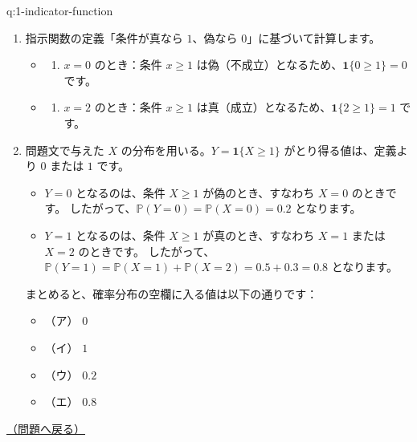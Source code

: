 \documentclass[
  pandoc]{bxjsarticle}
\providecommand{\tightlist}{%
  \setlength{\itemsep}{0pt}\setlength{\parskip}{0pt}}
\newcommand{\ind}{\mathbf{1}}
\begin{document}
\begin{answerbox}[phantomlabel=a:1-indicator-function]{q:1-indicator-function}

\begin{enumerate}
\def\labelenumi{\arabic{enumi}.}
\tightlist
\item
  指示関数の定義「条件が真なら \(1\)、偽なら
  \(0\)」に基づいて計算します。

  \begin{itemize}
  \tightlist
  \item
    \begin{enumerate}
    \def\labelenumii{(\alph{enumii})}
    \tightlist
    \item
      \(x = 0\) のとき：条件 \(x \ge 1\)
      は偽（不成立）となるため、\(\ind\{0 \ge 1\} = 0\) です。
    \end{enumerate}
  \item
    \begin{enumerate}
    \def\labelenumii{(\alph{enumii})}
    \setcounter{enumii}{1}
    \tightlist
    \item
      \(x = 2\) のとき：条件 \(x \ge 1\)
      は真（成立）となるため、\(\ind\{2 \ge 1\} = 1\) です。
    \end{enumerate}
  \end{itemize}
\item
  問題文で与えた \(X\) の分布を用いる。\(Y = \ind\{X \ge 1\}\)
  がとり得る値は、定義より \(0\) または \(1\) です。

  \begin{itemize}
  \tightlist
  \item
    \(Y = 0\) となるのは、条件 \(X \ge 1\) が偽のとき、すなわち
    \(X = 0\) のときです。
    したがって、\(\mathbb{P}(Y = 0) = \mathbb{P}(X = 0) = 0.2\)
    となります。
  \item
    \(Y = 1\) となるのは、条件 \(X \ge 1\) が真のとき、すなわち
    \(X = 1\) または \(X = 2\) のときです。
    したがって、\(\mathbb{P}(Y = 1) = \mathbb{P}(X = 1) + \mathbb{P}(X = 2) = 0.5 + 0.3 = 0.8\)
    となります。
  \end{itemize}

  まとめると、確率分布の空欄に入る値は以下の通りです：

  \begin{itemize}
  \tightlist
  \item
    （ア） \(0\)
  \item
    （イ） \(1\)
  \item
    （ウ） \(0.2\)
  \item
    （エ） \(0.8\)
  \end{itemize}
\end{enumerate}

\hfill 

\hyperref[q:1-indicator-function]{（問題へ戻る）}

\end{answerbox}
\end{document}
